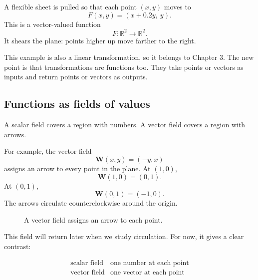 \begin{example}
A flexible sheet is pulled so that each point \((x,y)\) moves to
\[
    F(x,y)=(x+0.2y,\ y).
\]
This is a vector-valued function
\[
    F:\mathbb R^2\to\mathbb R^2.
\]
It shears the plane: points higher up move farther to the right.

This example is also a linear transformation, so it belongs to Chapter 3.  The new
point is that transformations are functions too.  They take points or vectors as inputs
and return points or vectors as outputs.
\end{example}

\subsection{Functions as fields of values}

A scalar field covers a region with numbers.  A vector field covers a region with arrows.

For example, the vector field
\[
    \mathbf W(x,y)=(-y,x)
\]
assigns an arrow to every point in the plane.  At \((1,0)\),
\[
    \mathbf W(1,0)=(0,1).
\]
At \((0,1)\),
\[
    \mathbf W(0,1)=(-1,0).
\]
The arrows circulate counterclockwise around the origin.

\begin{figure}[h]
\centering
{}
\caption{A vector field assigns an arrow to each point.}
\end{figure}

This field will return later when we study circulation.  For now, it gives a clear
contrast:

\[
\begin{array}{c|c}
\text{scalar field} & \text{one number at each point}\\
\text{vector field} & \text{one vector at each point}
\end{array}
\]

